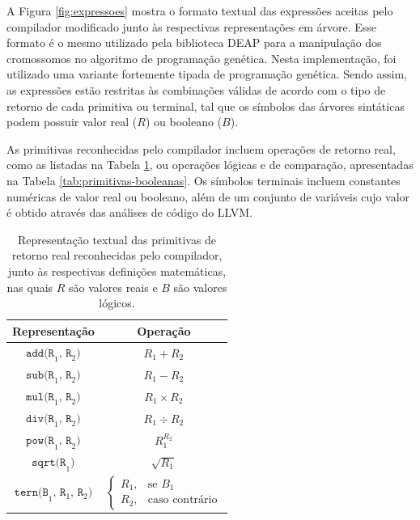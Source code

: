\documentclass[
	12pt,				%
	openright,			%
	twoside,			%
	a4paper,			%
	tcc,			%
	]{ABNT-DC-UEL}
\begin{document}
A Figura \ref{fig:expressoes} mostra o formato textual das expressões aceitas pelo compilador modificado junto às respectivas representações em árvore. Esse formato é o mesmo utilizado pela biblioteca DEAP para a manipulação dos cromossomos no algoritmo de programação genética. Nesta implementação, foi utilizado uma variante fortemente tipada de programação genética. Sendo assim, as expressões estão restritas às combinações válidas de acordo com o tipo de retorno de cada primitiva ou terminal, tal que os símbolos das árvores sintáticas podem possuir valor real ($R$) ou booleano ($B$). 

As primitivas reconhecidas pelo compilador incluem operações de retorno real, como as listadas na Tabela \ref{tab:primitivas-reais}, ou operações lógicas e de comparação, apresentadas na Tabela \ref{tab:primitivas-booleanas}. Os símbolos terminais incluem constantes numéricas de valor real ou booleano, além de um conjunto de variáveis cujo valor é obtido através das análises de código do LLVM. 

\begin{table}[htb]
    \centering
    \begin{tabular}{cc}
        \hline
        \textbf{Representação} & \textbf{Operação} \\
        \hline
        $\texttt{add(R}_1\texttt{, R}_2\texttt{)}$ & $R_1 + R_2$ \\
        $\texttt{sub(R}_1\texttt{, R}_2\texttt{)}$ & $R_1 - R_2$ \\
        $\texttt{mul(R}_1\texttt{, R}_2\texttt{)}$ & $R_1 \times R_2$ \\
        $\texttt{div(R}_1\texttt{, R}_2\texttt{)}$ & $R_1 \div R_2$ \\
        $\texttt{pow(R}_1\texttt{, R}_2\texttt{)}$ & $R_1^{R_2}$ \\
        $\texttt{sqrt(R}_1\texttt{)}$ & $\sqrt{R_1}$ \\
        $\texttt{tern(B}_1\texttt{, }\texttt{R}_1\texttt{, }\texttt{R}_2\texttt{)}$ & $\begin{cases}
             R_1, & \text{se } B_1 \\
             R_2, & \text{caso contrário}
         \end{cases}$ \\
        \hline
    \end{tabular}
    \caption{Representação textual das primitivas de retorno real reconhecidas pelo compilador, junto às respectivas definições matemáticas, nas quais $R$ são valores reais e $B$ são valores lógicos.}
    \label{tab:primitivas-reais}
\end{table}
\end{document}
